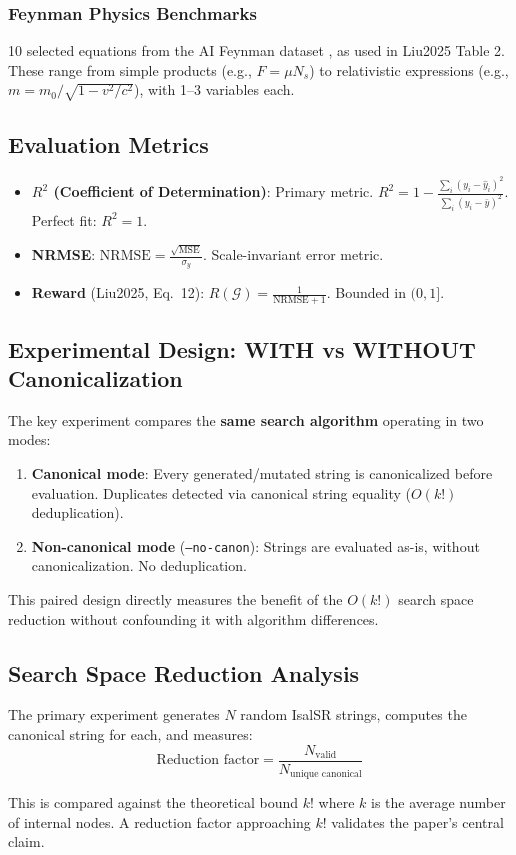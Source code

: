\subsubsection{Feynman Physics Benchmarks}

10 selected equations from the AI Feynman dataset \cite{udrescu2020},
as used in Liu2025 Table 2. These range from simple products
(e.g., $F = \mu N_s$) to relativistic expressions
(e.g., $m = m_0 / \sqrt{1 - v^2/c^2}$), with 1--3 variables each.

\subsection{Evaluation Metrics}

\begin{itemize}[nosep]
  \item \textbf{$R^2$ (Coefficient of Determination)}: Primary metric.
    $R^2 = 1 - \frac{\sum_i (y_i - \hat{y}_i)^2}{\sum_i (y_i - \bar{y})^2}$.
    Perfect fit: $R^2 = 1$.
  \item \textbf{NRMSE}: $\text{NRMSE} = \frac{\sqrt{\text{MSE}}}{\sigma_y}$.
    Scale-invariant error metric.
  \item \textbf{Reward} (Liu2025, Eq.~12):
    $R(\mathcal{G}) = \frac{1}{\text{NRMSE} + 1}$.
    Bounded in $(0, 1]$.
\end{itemize}

\subsection{Experimental Design: WITH vs WITHOUT Canonicalization}

The key experiment compares the \textbf{same search algorithm} operating
in two modes:
\begin{enumerate}[nosep]
  \item \textbf{Canonical mode}: Every generated/mutated string is canonicalized
    before evaluation. Duplicates detected via canonical string equality
    ($O(k!)$ deduplication).
  \item \textbf{Non-canonical mode} (\texttt{--no-canon}): Strings are evaluated
    as-is, without canonicalization. No deduplication.
\end{enumerate}

This paired design directly measures the benefit of the $O(k!)$ search space
reduction without confounding it with algorithm differences.

\subsection{Search Space Reduction Analysis}

The primary experiment generates $N$ random IsalSR strings, computes the
canonical string for each, and measures:
\begin{equation}
  \text{Reduction factor} = \frac{N_{\text{valid}}}{N_{\text{unique canonical}}}
\end{equation}

This is compared against the theoretical bound $k!$ where $k$ is the average
number of internal nodes. A reduction factor approaching $k!$ validates the
paper's central claim.
